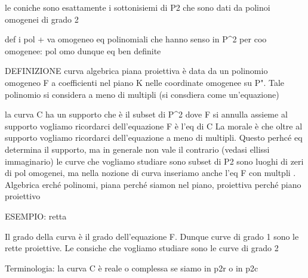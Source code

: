 le coniche sono esattamente i sottonisiemi di P2 che sono dati da polinoi omogenei di grado 2



def i pol + va omogeneo
eq polinomiali che hanno senso in P^2 per coo omogenee: pol omo
dunque eq ben definite


DEFINIZIONE
curva algebrica piana proiettiva è data da un polinomio omogeneo F a coefficienti nel piano K nelle coordinate omogenee su P". Tale polinomio si considera a meno di multipli (si consdiera come un'equazione)

la curva C ha un supporto che è il subset di P^2 dove F si annulla
assieme al supporto vogliamo ricordarci dell'equazione
F è l'eq di C
La morale è che oltre al supporto vogliamo ricordarci dell'equazione a meno di multipli. Questo perhcé eq determina il supporto, ma in generale non vale il contrario  (vedasi ellissi immaginario)
le curve che vogliamo studiare sono subset di P2 sono luoghi di zeri di pol omogenei, ma nella nozione di curva inseriamo anche l'eq F con multpli . Algebrica erché polinomi, piana perché siamon nel piano, proiettiva perché piano proiettivo


ESEMPIO: retta

Il grado della curva è il grado dell'equazione F. Dunque curve di grado 1 sono le rette proiettive. Le consiche che vogliamo studiare sono le curve di grado 2

Terminologia: la curva C è reale o complessa se siamo in p2r o in p2c


